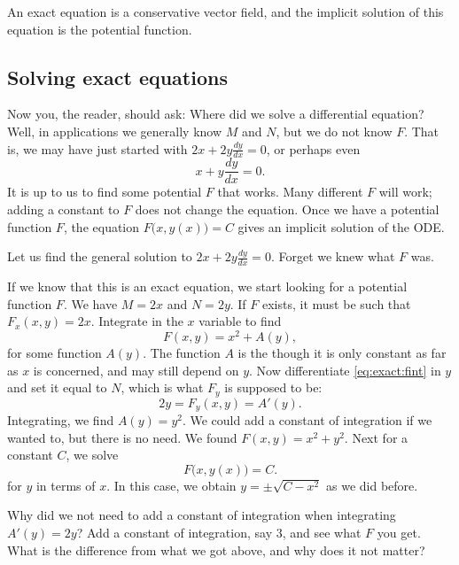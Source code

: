 An exact equation is a conservative vector field, and the implicit
solution of this equation is the potential function.

\subsection{Solving exact equations}

Now you, the reader, should ask: Where did we solve a differential equation?
Well, in applications we generally know $M$ and $N$, but we do not
know $F$.  That is, we may have just started with
$2x + 2y \frac{dy}{dx} = 0$, or perhaps even
\begin{equation*}
x + y \frac{dy}{dx} = 0 .
\end{equation*}
It is up to us to find some potential $F$ that works.  Many different $F$
will work; adding a constant to $F$ does not change the equation.
Once we have a potential function $F$, the equation 
$F\bigl(x,y(x)\bigr) = C$
gives an implicit solution of the ODE\@.

\begin{example}
Let us find the general solution to
$2x + 2y \frac{dy}{dx} = 0$.  Forget we knew
what $F$ was.

If we know that this is an exact equation, we start looking for a potential
function $F$.
We have $M = 2x$ and $N=2y$.
If $F$ exists, it must be such that
$F_x (x,y) = 2x$.
Integrate in the $x$ variable to find
\begin{equation} \label{eq:exact:fint}
F(x,y) = x^2 + A(y) ,
\end{equation}
for some function $A(y)$.  The function $A$ is the  though it is only constant as far as $x$ is concerned, and
may still depend on $y$.  Now differentiate \eqref{eq:exact:fint} in $y$ 
and set it equal to $N$, which is what $F_y$ is supposed to be:
\begin{equation*}
2y = F_y (x,y) = A'(y) .
\end{equation*}
Integrating, we find $A(y) = y^2$.  We could add a constant of integration
if we wanted to, but there is no need.  We found $F(x,y) = x^2+y^2$.
Next for a constant $C$, we solve
\begin{equation*}
F\bigl(x,y(x)\bigr) = C .
\end{equation*}
for $y$ in terms of $x$.  In this case, we obtain $y = \pm \sqrt{C-x^2}$
as we did before.
\end{example}

\begin{exercise}
Why did we not need to add a constant of integration when integrating $A'(y)
= 2y$?  Add a constant of integration, say $3$, and see what $F$ you get.
What is the difference from what we got above, and why does it not matter?
\end{exercise}



